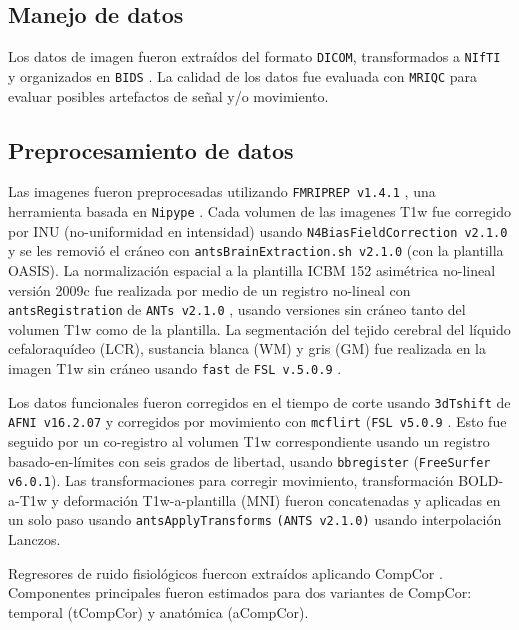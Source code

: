 \subsection{Manejo de datos}
Los datos de imagen fueron extraídos del formato \texttt{DICOM}, transformados a \texttt{NIfTI} y organizados en \texttt{BIDS} \parencite{Gorgolewski2016}.
La calidad de los datos fue evaluada con \texttt{MRIQC} \parencite{Esteban2017} para evaluar posibles artefactos de señal y/o movimiento. \par

\subsection{Preprocesamiento de datos}
Las imagenes fueron preprocesadas utilizando \texttt{FMRIPREP v1.4.1} \parencite{Esteban2019}, una herramienta basada en \texttt{Nipype} \parencite{Gorgolewski2011}.
Cada volumen de las imagenes T1w fue corregido por INU (no-uniformidad en intensidad) usando \texttt{N4BiasFieldCorrection v2.1.0} \parencite{Tustison2010} y se les removió el cráneo con \texttt{antsBrainExtraction.sh v2.1.0} (con la plantilla OASIS).
La normalización espacial a la plantilla ICBM 152 asimétrica no-lineal versión 2009c \parencite{Fonov2009} fue realizada por medio de un registro no-lineal con \texttt{antsRegistration} de \texttt{ANTs v2.1.0} \parencite{Avants2008}, usando versiones sin cráneo tanto del volumen T1w como de la plantilla.
La segmentación del tejido cerebral del líquido cefaloraquídeo (LCR), sustancia blanca (WM) y gris (GM) fue realizada en la imagen T1w sin cráneo usando \texttt{fast} de \texttt{FSL v.5.0.9} \parencite{Zhang2001}.\par
Los datos funcionales fueron corregidos en el tiempo de corte usando \texttt{3dTshift} de \texttt{AFNI v16.2.07} \parencite{Cox1996} y corregidos por movimiento con \texttt{mcflirt} (\texttt{FSL v5.0.9} \parencite{Jenkinson2002}.
Esto fue seguido por un co-registro al volumen T1w correspondiente usando un registro basado-en-límites \parencite{Greve2009} con seis grados de libertad, usando \texttt{bbregister} (\texttt{FreeSurfer v6.0.1}).
Las transformaciones para corregir movimiento, transformación BOLD-a-T1w y deformación T1w-a-plantilla (MNI) fueron concatenadas y aplicadas en un solo paso usando \texttt{antsApplyTransforms} \texttt{(ANTS v2.1.0)} usando interpolación Lanczos.\par
Regresores de ruido fisiológicos fuercon extraídos aplicando CompCor \parencite{Behzadi2007}.
Componentes principales fueron estimados para dos variantes de CompCor: temporal (tCompCor) y anatómica (aCompCor).
